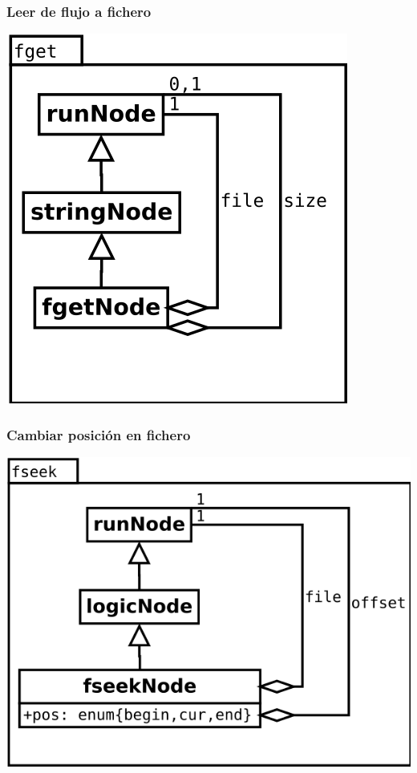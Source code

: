 \begin{multicols}{2}
   \subsubsection {Leer de flujo a fichero} 
   \begin{center}
   \includegraphics[scale=0.4]{fget.png} \\
   \end{center}

   \subsubsection {Cambiar posición en fichero} 
   \begin{center}
   \includegraphics[scale=0.4]{fseek.png} \\
   \end{center}
\columnbreak

\end{multicols}
